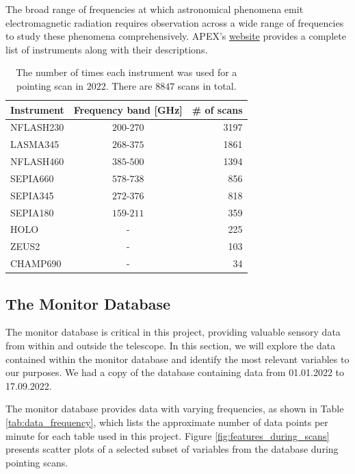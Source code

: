 The broad range of frequencies at which astronomical phenomena emit electromagnetic radiation requires observation across a wide range of frequencies to study these phenomena comprehensively.
APEX's \href{https://www.eso.org/sci/facilities/apex/cfp/cfp110/instrument_summary.html.html}{website} provides a complete list of instruments along with their descriptions.
\begin{table}[H]
    \centering
    \caption[Number of scans for each instrument]{The number of times each instrument was used for a pointing scan in $2022$. There are $8847$ scans in total.}
    \begin{tabular}{lcr}
        \toprule
        Instrument & Frequency band [GHz] &\# of scans \\
        \midrule
        NFLASH230 & $200$-$270$ &3197 \\
        LASMA345  & $268$-$375$ &1861 \\
        NFLASH460 & $385$-$500$ &1394 \\
        SEPIA660  & $578$-$738$ & 856 \\
        SEPIA345  & $272$-$376$ & 818 \\
        SEPIA180  & $159$-$211$ & 359 \\
        HOLO      & - & 225 \\
        ZEUS2     & - & 103 \\
        CHAMP690  & - &  34 \\
        \bottomrule
        \end{tabular}
        \label{tab:instrument_usage}
\end{table}



\subsection{The Monitor Database}
The monitor database is critical in this project, providing valuable sensory data from within and outside the telescope.
In this section, we will explore the data contained within the monitor database and identify the most relevant variables to our purposes.
We had a copy of the database containing data from 01.01.2022 to 17.09.2022.

The monitor database provides data with varying frequencies, as shown in Table \ref{tab:data_frequency},
which lists the approximate number of data points per minute for each table used in this project.
Figure \ref{fig:features_during_scans} presents scatter plots of a selected subset of variables from the database during pointing scans.  

